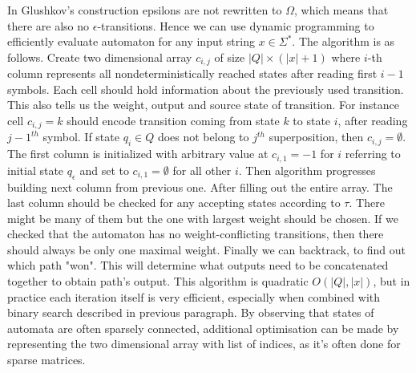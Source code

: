 In Glushkov's construction epsilons are not rewritten to $\Omega$, which means that there are also no $\epsilon$-transitions. Hence we can use dynamic programming to efficiently evaluate automaton for any input string $x\in\Sigma^*$. The algorithm is as follows. Create two dimensional array $c_{i,j}$ of size $\vert Q \vert \times (\vert x \vert+1)$
where $i$-th column represents all nondeterministically reached states after reading first $i-1$ symbols. Each cell should hold information about the previously used transition. This also tells us the weight, output and source state of transition. For instance cell $c_{i,j}=k$ should encode transition coming from state $k$ to state $i$, after reading $j-1^{th}$ symbol. If state $q_i\in Q$ does not belong to $j^{th}$ superposition, then $c_{i,j}=\emptyset$. The first column is initialized with arbitrary value at $c_{i,1}=-1$ for $i$ referring to initial state $q_\epsilon$ and set to $c_{i,1}=\emptyset$ for all other $i$. Then algorithm progresses building next column from previous one. After filling out the entire array. The last column should be checked for any accepting states according to $\tau$. There might be many of them but the one with largest weight should be chosen. If we checked that the automaton has no weight-conflicting transitions, then there should always be only one maximal weight. Finally we can backtrack, to find out which path "won". This will determine what outputs need to be concatenated together to obtain path's output. This algorithm is quadratic $O(\vert Q\vert, \vert x \vert)$, but in practice each iteration itself is very efficient, especially when combined with binary search described in previous paragraph. By observing that states of automata are often sparsely connected, additional optimisation can be made by representing the two dimensional array with list of indices, as it's often done for sparse matrices.







%
%





